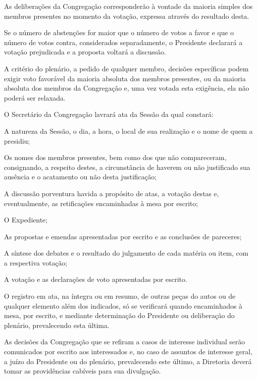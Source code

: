 \documentclass{documento}
\begin{document}
\artigo As deliberações da Congregação corresponderão à vontade da maioria simples dos membros presentes no momento da votação, expressa através do resultado desta.

\paragrafo Se o número de abstenções for maior que o número de votos a favor e que o número de votos contra, considerados separadamente, o Presidente declarará a votação prejudicada e a proposta voltará a discussão.

\paragrafo A critério do plenário, a pedido de qualquer membro, decisões específicas podem exigir voto favorável da maioria absoluta dos membros presentes, ou da maioria absoluta dos membros da Congregação e, uma vez votada esta exigência, ela não poderá ser relaxada.


\artigo O Secretário da Congregação lavrará ata da Sessão da qual constará:

\inciso A natureza da Sessão, o dia, a hora, o local de sua realização e o nome de quem a presidiu;

\inciso Os nomes dos membros presentes, bem como dos que não compareceram, consignando, a respeito destes, a circunstância de haverem ou não justificado sua ausência e o acatamento ou não desta justificação;

\inciso A discussão porventura havida a propósito de atas, a votação destas e, eventualmente, as retificações encaminhadas à mesa por escrito;

\inciso O Expediente;

\inciso As propostas e emendas apresentadas por escrito e as conclusões de pareceres;

\inciso A síntese dos debates e o resultado do julgamento de cada matéria ou item, com a respectiva votação;

\inciso A votação e as declarações de voto apresentadas por escrito.

\paragrafounico O registro em ata, na íntegra ou em resumo, de outras peças do autos ou de qualquer elemento além dos indicados, só se verificará quando encaminhados à mesa, por escrito, e mediante determinação do Presidente ou deliberação do plenário, prevalecendo esta última.

\artigo As decisões da Congregação que se refiram a casos de interesse individual serão comunicados por escrito aos interessados e, no caso de assuntos de interesse geral, a juízo do Presidente ou do plenário, prevalecendo este último, a Diretoria deverá tomar as providências cabíveis para sua divulgação.
\end{document}
